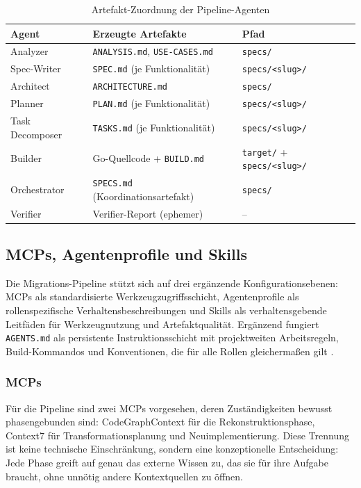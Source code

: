 \begin{table}[H]
\centering
\begin{tabular}{|p{3.0cm}|p{5.5cm}|p{4.0cm}|}
\hline
\textbf{Agent} & \textbf{Erzeugte Artefakte} & \textbf{Pfad} \\
\hline
Analyzer & \texttt{ANALYSIS.md}, \texttt{USE-CASES.md} & \texttt{specs/} \\
\hline
Spec-Writer & \texttt{SPEC.md} (je Funktionalität) & \texttt{specs/<slug>/} \\
\hline
Architect & \texttt{ARCHITECTURE.md} & \texttt{specs/} \\
\hline
Planner & \texttt{PLAN.md} (je Funktionalität) & \texttt{specs/<slug>/} \\
\hline
Task Decomposer & \texttt{TASKS.md} (je Funktionalität) & \texttt{specs/<slug>/} \\
\hline
Builder & Go-Quellcode + \texttt{BUILD.md} & \texttt{target/} + \texttt{specs/<slug>/} \\
\hline
Orchestrator & \texttt{SPECS.md} (Koordinationsartefakt) & \texttt{specs/} \\
\hline
Verifier & Verifier-Report (ephemer) & -- \\
\hline
\end{tabular}
\caption{Artefakt-Zuordnung der Pipeline-Agenten}
\label{tab:artefakte}
\end{table}

\subsection{MCPs, Agentenprofile und Skills}

Die Migrations-Pipeline stützt sich auf drei ergänzende Konfigurationsebenen: MCPs als standardisierte Werkzeugzugriffsschicht, Agentenprofile als rollenspezifische Verhaltensbeschreibungen und Skills als verhaltensgebende Leitfäden für Werkzeugnutzung und Artefaktqualität. Ergänzend fungiert \texttt{AGENTS.md} als persistente Instruktionsschicht mit projektweiten Arbeitsregeln, Build-Kommandos und Konventionen, die für alle Rollen gleichermaßen gilt \parencite{agentsmd}.

\subsubsection{MCPs}

Für die Pipeline sind zwei MCPs vorgesehen, deren Zuständigkeiten bewusst phasengebunden sind: CodeGraphContext für die Rekonstruktionsphase, Context7 für Transformationsplanung und Neuimplementierung. Diese Trennung ist keine technische Einschränkung, sondern eine konzeptionelle Entscheidung: Jede Phase greift auf genau das externe Wissen zu, das sie für ihre Aufgabe braucht, ohne unnötig andere Kontextquellen zu öffnen.

